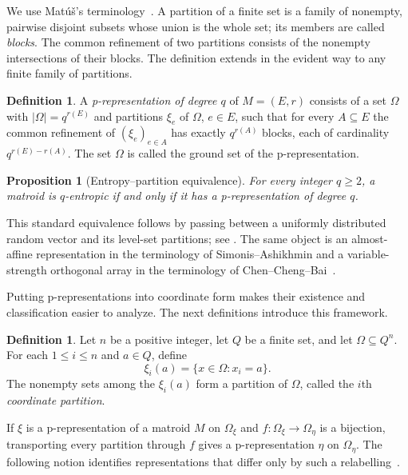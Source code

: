\documentclass[preprint,12pt]{elsarticle}
\newtheorem{proposition}[theorem]{Proposition}
\theoremstyle{definition}
\newtheorem{definition}[theorem]{Definition}
\begin{document}
We use Mat\'u\v{s}'s terminology~\cite[Definition~1.1]{Matus1999}.
A partition of a finite set is a family of nonempty, pairwise disjoint subsets
whose union is the whole set; its members are called \emph{blocks}. The common
refinement of two partitions consists of the nonempty intersections of their
blocks. The definition extends in the evident way to any finite family of
partitions.

\begin{definition}
A \emph{p-representation of degree $q$} of $M=(E,r)$ consists of a set $\Omega$ with $|\Omega|=q^{r(E)}$ and partitions $\xi_e$ of $\Omega$, $e\in E$, such that for every $A\subseteq E$ the common refinement of $(\xi_e)_{e\in A}$ has exactly $q^{r(A)}$ blocks, each of cardinality $q^{r(E)-r(A)}$. The set $\Omega$ is called the ground set of the p-representation.
\end{definition}

\begin{proposition}[Entropy--partition equivalence]\label{prop:entropy-partition}
For every integer $q\ge2$, a matroid is $q$-entropic if and only if it has a p-representation of degree $q$.
\end{proposition}

This standard equivalence follows by passing between a uniformly distributed random vector and its level-set partitions; see \cite[Section~3.1.2 and Theorem~1]{ChenChengBai2021}. The same object is an almost-affine representation in the terminology of Simonis--Ashikhmin and a variable-strength orthogonal array in the terminology of Chen--Cheng--Bai~\cite{SimonisAshikhmin1998,ChenChengBai2021}.

Putting p-representations into coordinate form makes their existence and classification easier to analyze. The next definitions introduce this framework.

\begin{definition}
Let $n$ be a positive integer, let $Q$ be a finite set, and let $\Omega\subseteq Q^n$. For each $1\le i\le n$ and $a\in Q$, define
\[
\xi_i(a)=\{x\in\Omega:x_i=a\}.
\]
The nonempty sets among the $\xi_i(a)$ form a partition of $\Omega$, called the $i$th \emph{coordinate partition}.
\end{definition}

If $\xi$ is a p-representation of a matroid $M$ on $\Omega_\xi$ and $f:\Omega_\xi\to\Omega_\eta$ is a bijection, transporting every partition through $f$ gives a p-representation $\eta$ on $\Omega_\eta$. The following notion identifies representations that differ only by such a relabelling~\cite[Definition~1.3]{Matus1999}.
\end{document}
